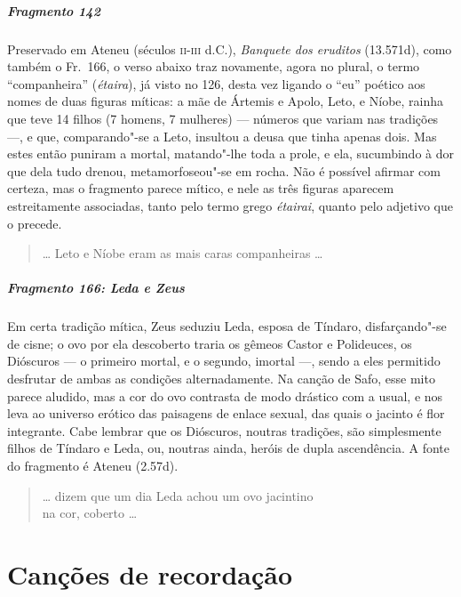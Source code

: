 \paragraph{Fragmento 142}

{\small Preservado em Ateneu (séculos \textsc{ii-iii} d.C.), \textit{Banquete dos eruditos}  (13.571d), como também o Fr.~166, o verso abaixo traz novamente,
agora no plural, o termo ``companheira” (\textit{étaira}), já visto no
126, desta vez ligando o “eu” poético aos nomes de duas figuras míticas: a mãe de
Ártemis e Apolo, Leto, e Níobe, rainha que teve 14 filhos (7 homens, 7
mulheres) --- números que variam nas tradições ---, e que, comparando"-se a Leto, insultou a deusa que tinha apenas dois.
Mas estes então puniram a mortal, matando"-lhe toda a prole, e ela, sucumbindo à dor que dela tudo drenou, metamorfoseou"-se em rocha. Não é possível afirmar
com certeza, mas o fragmento parece mítico, e nele as três figuras aparecem
estreitamente associadas, tanto pelo termo grego \textit{étairai}, quanto pelo
adjetivo que o precede.}

\begin{verse}
\ldots{} Leto e Níobe eram as mais caras companheiras \ldots{}
\end{verse}


\paragraph{Fragmento 166: Leda e Zeus}

{\small Em certa tradição mítica, Zeus seduziu Leda, esposa de Tíndaro, disfarçando"-se
de cisne; o ovo por ela descoberto traria os gêmeos Castor e Polideuces, os
Dióscuros --- o primeiro mortal, e o segundo, imortal ---, sendo a eles
permitido desfrutar de ambas as condições alternadamente. Na canção de Safo,
esse mito parece aludido, mas a cor do ovo contrasta de modo drástico com a usual,
e nos leva ao universo erótico das paisagens de enlace sexual, das quais o
jacinto é flor integrante. Cabe lembrar que os Dióscuros, noutras tradições,
são simplesmente filhos de Tíndaro e Leda, ou, noutras ainda, heróis de dupla
ascendência. A fonte do fragmento é Ateneu (2.57d).}

\begin{verse}
\ldots{} dizem que um dia Leda achou um ovo jacintino\\
na cor, coberto \ldots{}
\end{verse}


\chapter{Canções de recordação}

